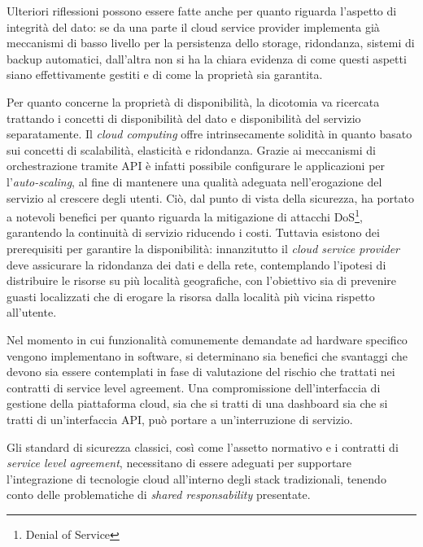\documentclass[../main.tex]{subfiles}
\begin{document}
Ulteriori riflessioni possono essere fatte anche per quanto riguarda l'aspetto di integrità del dato: se da una parte il cloud service provider implementa già meccanismi di basso livello per la persistenza dello storage, ridondanza, sistemi di backup automatici, dall'altra non si ha la chiara evidenza di come questi aspetti siano effettivamente gestiti e di come la proprietà sia garantita.


Per quanto concerne la proprietà di disponibilità, la dicotomia va ricercata trattando i concetti di disponibilità del dato e disponibilità del servizio separatamente.
Il \textit{cloud computing} offre intrinsecamente solidità in quanto basato sui concetti di scalabilità, elasticità e ridondanza. Grazie ai meccanismi di orchestrazione tramite API è infatti possibile configurare le applicazioni per l'\textit{auto-scaling}, al fine di mantenere una qualità adeguata nell'erogazione del servizio al crescere degli utenti. Ciò, dal punto di vista della sicurezza, ha portato a notevoli benefici per quanto riguarda la mitigazione di attacchi DoS\footnote{Denial of Service}, garantendo la continuità di servizio riducendo i costi.
Tuttavia esistono dei prerequisiti per garantire la disponibilità: innanzitutto il \textit{cloud service provider} deve assicurare la ridondanza dei dati e della rete, contemplando l'ipotesi di distribuire le risorse su più località geografiche, con l'obiettivo sia di prevenire guasti localizzati che di erogare la risorsa dalla località più vicina rispetto all'utente.

Nel momento in cui funzionalità comunemente demandate ad hardware specifico vengono implementano in software, si determinano sia benefici che svantaggi che devono sia essere contemplati in fase di valutazione del rischio che trattati nei contratti di service level agreement. Una compromissione dell'interfaccia di gestione della piattaforma cloud, sia che si tratti di una dashboard sia che si tratti di un'interfaccia API, può portare a un'interruzione di servizio.

Gli standard di sicurezza classici, così come l'assetto normativo e i contratti di \textit{service level agreement}, necessitano di essere adeguati per supportare l'integrazione di tecnologie cloud all'interno degli stack tradizionali, tenendo conto delle problematiche di \textit{shared responsability} presentate.
\end{document}
